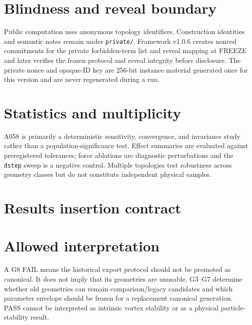 \documentclass[11pt,a4paper]{article}
\newcommand{\code}[1]{\texttt{#1}}
\begin{document}
\section{Blindness and reveal boundary}
Public computation uses anonymous topology identifiers. Construction identities and semantic notes remain under \code{private/}. Framework v1.0.6 creates nonced commitments for the private forbidden-term list and reveal mapping at FREEZE and later verifies the frozen protocol and reveal integrity before disclosure. The private nonce and opaque-ID key are 256-bit instance material generated once for this version and are never regenerated during a run.
\section{Statistics and multiplicity}
A058 is primarily a deterministic sensitivity, convergence, and invariance study rather than a population-significance test. Effect summaries are evaluated against preregistered tolerances; force ablations are diagnostic perturbations and the \code{dstep} sweep is a negative control. Multiple topologies test robustness across geometry classes but do not constitute independent physical samples.
\section{Results insertion contract}
\section{Allowed interpretation}
A G8 FAIL means the historical export protocol should not be promoted as canonical. It does not imply that its geometries are unusable. G3--G7 determine whether old geometries can remain comparison/legacy candidates and which parameter envelope should be frozen for a replacement canonical generation. PASS cannot be interpreted as intrinsic vortex stability or as a physical particle-stability result.
\end{document}
